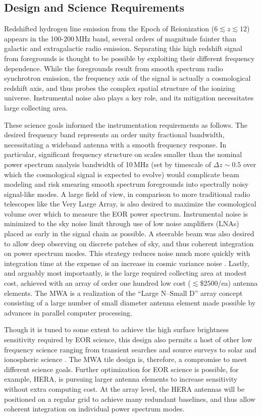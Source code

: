 \subsection{Design and Science Requirements}
Redshifted hydrogen line emission from the Epoch of Reionization ($6\lesssim z\lesssim12$) appears in the 100-200\,MHz band, several orders of magnitude fainter than galactic and extragalactic radio emission. Separating this high redshift signal from foregrounds is thought to be possible by exploiting their different frequency dependence. While the foregrounds result from smooth spectrum radio synchrotron emission, the frequency axis of the signal is actually a cosmological redshift axis, and thus probes the complex spatial structure of the ionizing universe. Instrumental noise also plays a key role, and its mitigation necessitates large collecting area.

These science goals informed the instrumentation requirements as follows. The desired frequency band represents an order unity fractional bandwidth, necessitating a wideband antenna with a smooth frequency response. In particular, significant frequency structure on scales smaller than the nominal power spectrum analysis bandwidth of 10\,MHz (set by timescale of $\Delta z\sim0.5$ over which the cosmological signal is expected to evolve) would complicate beam modeling and risk smearing smooth spectrum foregrounds into spectrally noisy signal-like modes. A large field of view, in comparison to more traditional radio telescopes like the Very Large Array, is also desired to maximize the cosmological volume over which to measure the EOR power spectrum. Instrumental noise is minimized to the sky noise limit through use of low noise amplifiers (LNAs) placed as early in the signal chain as possible. A steerable beam was also desired to allow deep observing on discrete patches of sky, and thus coherent integration on power spectrum modes. This strategy reduces noise much more quickly with integration time at the expense of an increase in cosmic variance noise \citep{TrottObservingModes}. Lastly, and arguably most importantly, is the large required collecting area at modest cost, achieved with an array of order one hundred low cost ($\lesssim\$2500$/ea) antenna elements. The MWA is a realization of the ``Large N--Small D'' array concept consisting of a large number of small diameter antenna element made possible by advances in parallel computer processing. 

Though it is tuned to some extent to achieve the high surface brightness sensitivity required by EOR science, this design also permits a host of other low frequency science ranging from transient searches and source surveys to solar and ionospheric science \citep{mwascience}. The MWA tile design is, therefore, a compromise to meet different science goals. Further optimization for EOR science is possible, for example, HERA, is pursuing larger antenna elements to increase sensitivity without extra computing cost. At the array level, the HERA antennas will be positioned on a regular grid to achieve many redundant baselines, and thus allow coherent integration on individual power spectrum modes.

